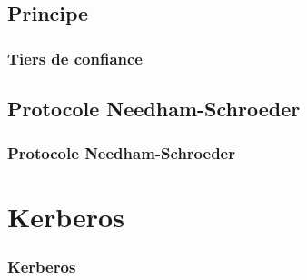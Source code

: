 \documentclass[svgnames]{beamer}
\begin{document}
\subsection{Principe}
\begin{frame}
 \frametitle{Tiers de confiance}

\end{frame}

\subsection{Protocole Needham-Schroeder}
\begin{frame}
  \frametitle{Protocole Needham-Schroeder}





\end{frame}

\section{Kerberos}

\begin{frame}
  \frametitle{Kerberos}
\end{frame}
\end{document}
